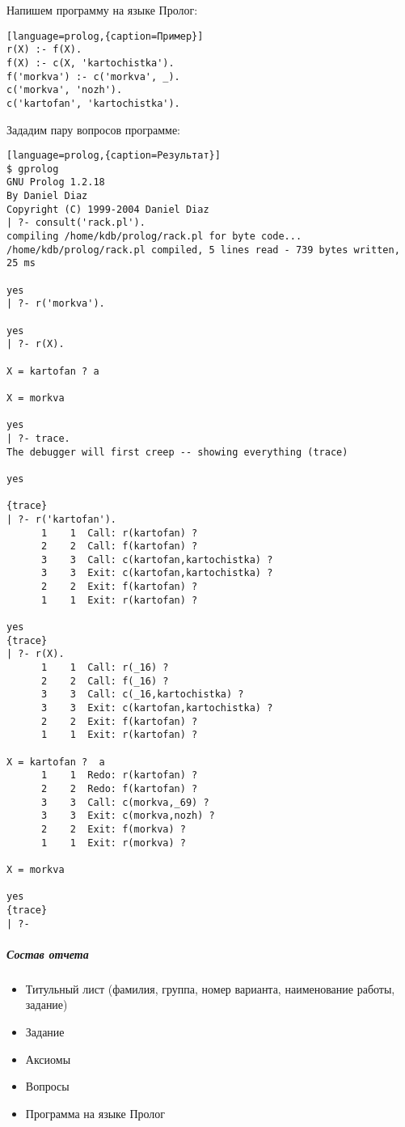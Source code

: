 \documentclass[a4paper,12pt]{article}
\begin{document}
Напишем программу на языке Пролог:
\begin{lstlisting}[language=prolog,{caption=Пример}]
r(X) :- f(X).
f(X) :- c(X, 'kartochistka').
f('morkva') :- c('morkva', _).
c('morkva', 'nozh').
c('kartofan', 'kartochistka').
\end{lstlisting}

Зададим пару вопросов программе:
\begin{lstlisting}[language=prolog,{caption=Результат}]
$ gprolog
GNU Prolog 1.2.18
By Daniel Diaz
Copyright (C) 1999-2004 Daniel Diaz
| ?- consult('rack.pl').
compiling /home/kdb/prolog/rack.pl for byte code...
/home/kdb/prolog/rack.pl compiled, 5 lines read - 739 bytes written, 25 ms

yes
| ?- r('morkva').

yes
| ?- r(X).

X = kartofan ? a

X = morkva

yes
| ?- trace.
The debugger will first creep -- showing everything (trace)

yes

{trace}
| ?- r('kartofan').
      1    1  Call: r(kartofan) ? 
      2    2  Call: f(kartofan) ? 
      3    3  Call: c(kartofan,kartochistka) ? 
      3    3  Exit: c(kartofan,kartochistka) ? 
      2    2  Exit: f(kartofan) ? 
      1    1  Exit: r(kartofan) ? 

yes
{trace}
| ?- r(X).         
      1    1  Call: r(_16) ? 
      2    2  Call: f(_16) ? 
      3    3  Call: c(_16,kartochistka) ? 
      3    3  Exit: c(kartofan,kartochistka) ? 
      2    2  Exit: f(kartofan) ? 
      1    1  Exit: r(kartofan) ? 

X = kartofan ?  a
      1    1  Redo: r(kartofan) ? 
      2    2  Redo: f(kartofan) ? 
      3    3  Call: c(morkva,_69) ? 
      3    3  Exit: c(morkva,nozh) ? 
      2    2  Exit: f(morkva) ? 
      1    1  Exit: r(morkva) ? 

X = morkva

yes
{trace}
| ?- 
\end{lstlisting}

\subparagraph{Состав отчета}
\begin{itemize}
	\item Титульный лист (фамилия, группа, номер варианта, наименование работы, задание)
	\item Задание
	\item Аксиомы
	\item Вопросы
	\item Программа на языке Пролог
\end{itemize}
\end{document}
